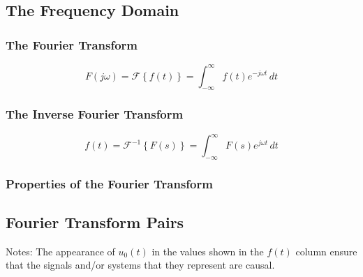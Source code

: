 \subsection*{The Frequency Domain}

\subsubsection*{The Fourier Transform}

$$
F(j\omega) = \mathcal{F}\left\{f(t)\right\} = \int_{-\infty}^{\infty} f(t)e^{-j\omega t}\,dt
$$

\subsubsection*{The Inverse Fourier Transform}

$$
f(t) = \mathcal{F}^{-1}\left\{F(s)\right\} = \int_{-\infty}^{\infty} F(s)e^{j\omega t}\,dt
$$


\subsubsection*{Properties of the Fourier Transform}



\subsection*{Fourier Transform Pairs}



Notes: The appearance of $u_0(t)$ in the values shown in the $f(t)$ column ensure that 
the signals and/or systems that they represent are causal.
    
\endinput
